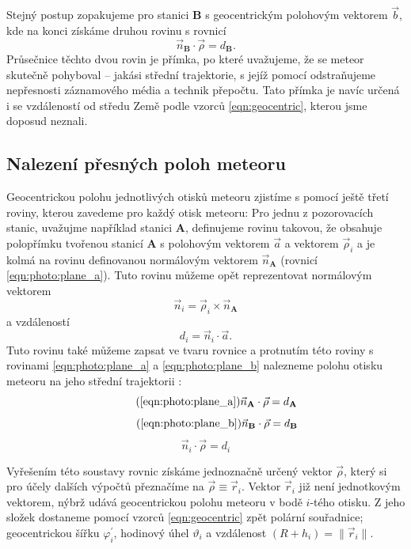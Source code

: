 \smallskip

Stejný postup zopakujeme pro stanici \textbf{B} s geocentrickým polohovým vektorem $\vec{b}$, kde na konci získáme druhou rovinu s rovnicí
\begin{equation}
    \vec{n}_\mathbf{B}\cdot \vec{\rho}=d_\mathbf{B}\text{.}
    \label{eqn:photo:plane_b}
\end{equation}
Průsečnice těchto dvou rovin je přímka, po které uvažujeme, že se meteor skutečně pohyboval -- jakási střední trajektorie, s jejíž pomocí odstraňujeme nepřesnosti záznamového média a technik přepočtu. Tato přímka je navíc určená i se vzdáleností od středu Země podle vzorců \eqref{eqn:geocentric}, kterou jsme doposud neznali.

\subsection{Nalezení přesných poloh meteoru}
Geocentrickou polohu jednotlivých otisků meteoru zjistíme s pomocí ještě třetí roviny, kterou zavedeme pro každý otisk meteoru: Pro jednu z pozorovacích stanic, uvažujme například stanici \textbf{A}, definujeme rovinu takovou, že obsahuje polopřímku tvořenou stanicí \textbf{A} s polohovým vektorem $\vec{a}$ a vektorem $\vec{\rho}_i$ a je kolmá na rovinu definovanou normálovým vektorem $\vec{n}_\mathbf{A}$ (rovnicí \eqref{eqn:photo:plane_a}). Tuto rovinu můžeme opět reprezentovat normálovým vektorem \cite{ceplecha}
\begin{equation}
    \vec{n}_i=\vec{\rho}_i\times\vec{n}_\mathbf{A}
\end{equation}
a vzdáleností
\begin{equation}
    d_i=\vec{n}_i\cdot \vec{a}\text{.}
\end{equation}
Tuto rovinu také můžeme zapsat ve tvaru rovnice a protnutím této roviny s rovinami \eqref{eqn:photo:plane_a} a \eqref{eqn:photo:plane_b} nalezneme polohu otisku meteoru na jeho střední trajektorii \cite{ceplecha}:
\begin{equation}
    \tag{\ref{eqn:photo:plane_a}}
    \vec{n}_\mathbf{A}\cdot\vec{\rho}=d_\mathbf{A}
\end{equation}
\begin{equation}
    \tag{\ref{eqn:photo:plane_b}}
    \vec{n}_\mathbf{B}\cdot\vec{\rho}=d_\mathbf{B}
\end{equation}
\begin{equation}
    \vec{n}_i\cdot\vec{\rho}=d_i
\end{equation}

Vyřešením této soustavy rovnic získáme jednoznačně určený vektor $\vec{\rho}$, který si pro účely dalších výpočtů přeznačíme na $\vec{\rho}\equiv\vec{r}_i$. Vektor $\vec{r}_i$ již není jednotkovým vektorem, nýbrž udává geocentrickou polohu meteoru v bodě $i$-tého otisku. Z jeho složek dostaneme pomocí vzorců \eqref{eqn:geocentric} zpět polární souřadnice; geocentrickou šířku $\varphi^\prime_i$, hodinový úhel $\vartheta_i$ a vzdálenost $(R+h_i)=\lVert\vec{r}_i\rVert$.
